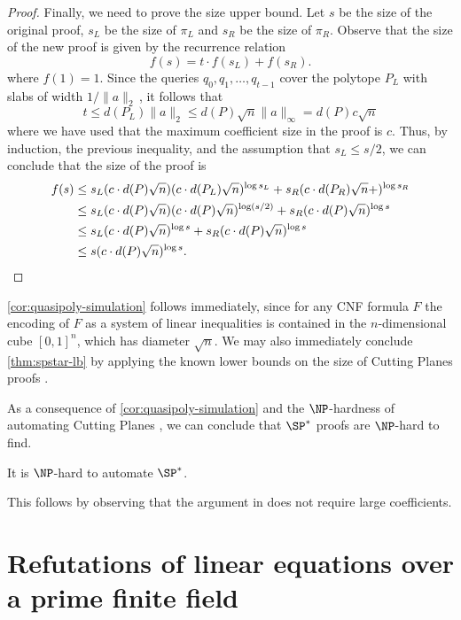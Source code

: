 \documentclass{toc}
\begin{document}
\begin{proof}
	Finally, we need to prove the size upper bound. Let $s$ be the size of the original proof, $s_L$ be the size of $\pi_L$ and $s_R$ be the size of $\pi_R$. Observe that the size of the new proof is given by the recurrence relation
	\[ f(s) = t \cdot f(s_L)+f(s_R). \] 
	where $f(1) = 1$. Since the queries $q_0,q_1,\ldots, q_{t-1}$ cover the polytope $P_L$ with slabs of width $1/\|a\|_2\,$, it follows that
	\[ t \leq d(P_L) \|a\|_2 \leq d(P) \sqrt{n} \|a\|_\infty =d(P)c \sqrt{n} \]
	where we have used that the maximum coefficient size in the proof is $c$. Thus, by induction, the previous inequality, and the assumption that $s_L \leq s/2$, we can conclude that the size of the proof is
	\begin{align*}
		f(s) &\leq s_L(c \cdot d(P) \sqrt{n})(c \cdot d(P_L) \sqrt{n})^{\log s_L} + s_R(c \cdot d(P_R) \sqrt{n} +)^{\log s_R} \\
		&\leq s_L(c \cdot d(P) \sqrt{n})(c \cdot d(P) \sqrt{n})^{\log (s/2)} + s_R(c \cdot d(P) \sqrt{n} )^{\log s}\\
		&\leq s_L(c \cdot d(P) \sqrt{n})^{\log s} + s_R(c \cdot d(P) \sqrt{n})^{\log s} \\
		&\leq s(c \cdot d(P) \sqrt{n})^{\log s}. \qedhere
	\end{align*}
\end{proof}

\autoref{cor:quasipoly-simulation} follows immediately, since for any CNF formula $F$ the encoding of $F$ as a system of linear inequalities is contained in the $n$-dimensional cube $[0,1]^n$, which has diameter $\sqrt{n}$. 
We may also immediately conclude \autoref{thm:spstar-lb} by applying the known lower bounds on the size of Cutting Planes proofs \cite{Pudlak97,FlemingPPR17,HrubesP17,GargGKS18}. 

As a consequence of \autoref{cor:quasipoly-simulation} and the
%
$\NP$-hardness of automating %
Cutting Planes \cite{GoosKMP20}, we can conclude that $\SP^*$ proofs
%
%
%
%
%
are $\NP$-hard to find.   %
%

\begin{corollary}
\label{cor:non-automatability} 
%
%
It is $\NP$-hard to automate $\SP^*$.   %
%
\end{corollary}
This follows by observing that the argument in \cite{GoosKMP20} does not
require large coefficients.








\section{Refutations of linear equations over a prime finite field}\label{sec:qpSPref}
\end{document}
